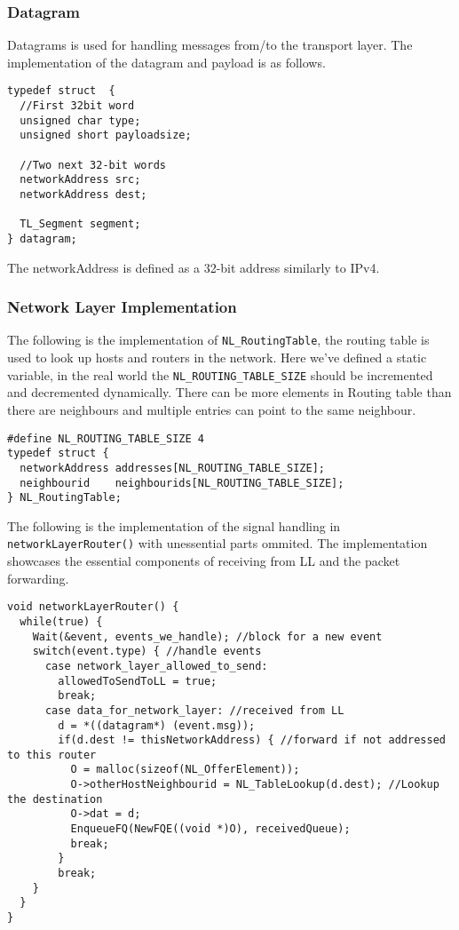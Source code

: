 \subsubsection{Datagram}
Datagrams is used for handling messages from/to the transport layer.
The implementation of the datagram and payload is as follows.
\begin{lstlisting}
typedef struct  {
  //First 32bit word
  unsigned char type;
  unsigned short payloadsize;

  //Two next 32-bit words
  networkAddress src;
  networkAddress dest;

  TL_Segment segment;
} datagram;
\end{lstlisting}
The networkAddress is defined as a 32-bit address similarly to IPv4.

\subsubsection{Network Layer Implementation}

The following is the implementation of \texttt{NL\_RoutingTable}, the routing table is used to look up hosts and routers in the network.
Here we've defined a static variable, in the real world the \texttt{NL\_ROUTING\_TABLE\_SIZE} should be incremented and decremented dynamically.
There can be more elements in Routing table than there are neighbours and multiple entries can point to the same neighbour.
\begin{lstlisting}
#define NL_ROUTING_TABLE_SIZE 4
typedef struct {
  networkAddress addresses[NL_ROUTING_TABLE_SIZE];
  neighbourid    neighbourids[NL_ROUTING_TABLE_SIZE];
} NL_RoutingTable;
\end{lstlisting}

The following is the implementation of the signal handling in \texttt{networkLayerRouter()} with unessential parts ommited. The implementation showcases the essential components of receiving from LL and the packet forwarding.
\begin{lstlisting}
void networkLayerRouter() {
  while(true) {
    Wait(&event, events_we_handle); //block for a new event
    switch(event.type) { //handle events
      case network_layer_allowed_to_send:
        allowedToSendToLL = true;
        break;
      case data_for_network_layer: //received from LL
        d = *((datagram*) (event.msg));
        if(d.dest != thisNetworkAddress) { //forward if not addressed to this router
          O = malloc(sizeof(NL_OfferElement));
          O->otherHostNeighbourid = NL_TableLookup(d.dest); //Lookup the destination
          O->dat = d;
          EnqueueFQ(NewFQE((void *)O), receivedQueue);
          break;
        }
        break;
    }
  }
}
\end{lstlisting}

